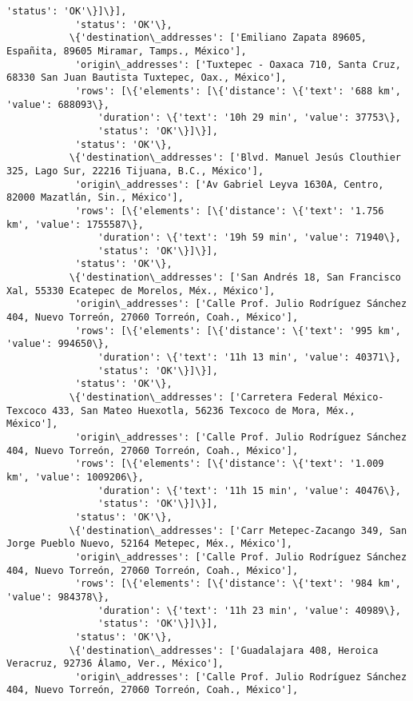 \documentclass[11pt]{article}
\begin{document}
\begin{Verbatim}[commandchars=\\\{\}]
                'status': 'OK'\}]\}],
            'status': 'OK'\},
           \{'destination\_addresses': ['Emiliano Zapata 89605, Españita, 89605 Miramar, Tamps., México'],
            'origin\_addresses': ['Tuxtepec - Oaxaca 710, Santa Cruz, 68330 San Juan Bautista Tuxtepec, Oax., México'],
            'rows': [\{'elements': [\{'distance': \{'text': '688 km', 'value': 688093\},
                'duration': \{'text': '10h 29 min', 'value': 37753\},
                'status': 'OK'\}]\}],
            'status': 'OK'\},
           \{'destination\_addresses': ['Blvd. Manuel Jesús Clouthier 325, Lago Sur, 22216 Tijuana, B.C., México'],
            'origin\_addresses': ['Av Gabriel Leyva 1630A, Centro, 82000 Mazatlán, Sin., México'],
            'rows': [\{'elements': [\{'distance': \{'text': '1.756 km', 'value': 1755587\},
                'duration': \{'text': '19h 59 min', 'value': 71940\},
                'status': 'OK'\}]\}],
            'status': 'OK'\},
           \{'destination\_addresses': ['San Andrés 18, San Francisco Xal, 55330 Ecatepec de Morelos, Méx., México'],
            'origin\_addresses': ['Calle Prof. Julio Rodríguez Sánchez 404, Nuevo Torreón, 27060 Torreón, Coah., México'],
            'rows': [\{'elements': [\{'distance': \{'text': '995 km', 'value': 994650\},
                'duration': \{'text': '11h 13 min', 'value': 40371\},
                'status': 'OK'\}]\}],
            'status': 'OK'\},
           \{'destination\_addresses': ['Carretera Federal México-Texcoco 433, San Mateo Huexotla, 56236 Texcoco de Mora, Méx., México'],
            'origin\_addresses': ['Calle Prof. Julio Rodríguez Sánchez 404, Nuevo Torreón, 27060 Torreón, Coah., México'],
            'rows': [\{'elements': [\{'distance': \{'text': '1.009 km', 'value': 1009206\},
                'duration': \{'text': '11h 15 min', 'value': 40476\},
                'status': 'OK'\}]\}],
            'status': 'OK'\},
           \{'destination\_addresses': ['Carr Metepec-Zacango 349, San Jorge Pueblo Nuevo, 52164 Metepec, Méx., México'],
            'origin\_addresses': ['Calle Prof. Julio Rodríguez Sánchez 404, Nuevo Torreón, 27060 Torreón, Coah., México'],
            'rows': [\{'elements': [\{'distance': \{'text': '984 km', 'value': 984378\},
                'duration': \{'text': '11h 23 min', 'value': 40989\},
                'status': 'OK'\}]\}],
            'status': 'OK'\},
           \{'destination\_addresses': ['Guadalajara 408, Heroica Veracruz, 92736 Álamo, Ver., México'],
            'origin\_addresses': ['Calle Prof. Julio Rodríguez Sánchez 404, Nuevo Torreón, 27060 Torreón, Coah., México'],

\end{Verbatim}
\end{document}
